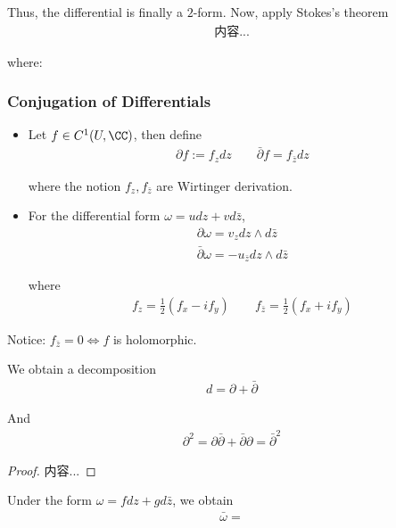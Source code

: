 \documentclass[Total.tex]{subfiles}
\begin{document}
		
		Thus, the differential is finally a $2$-form. Now, apply Stokes's theorem
		\begin{gather*}
			内容...
		\end{gather*}
		
		where: 
		
	\subsubsection{Conjugation of Differentials}
		\begin{Def}
			\begin{itemize}
				\item 
				Let $f\in C^1(U,\CC)$, then define
				\begin{gather*}
					\partial f:=f_zdz\qquad \bar{\partial} f=f_{\bar{z}}dz
				\end{gather*}
				
				where the notion $f_z,f_{\bar{z}}$ are Wirtinger derivation. 
				\item 
				For the differential form $\omega=udz+vd\bar{z}$,
				\begin{gather*}
					\partial\omega=v_z dz\wedge d\bar{z}\\
					\bar{\partial}\omega=-u_{\bar{z}} dz\wedge d\bar{z}
				\end{gather*}
				
				where 
				\begin{gather*}
					f_z=\frac{1}{2}(f_x-if_y)\qquad f_{\bar{z}}=\frac{1}{2}(f_x+if_y)
				\end{gather*}
			\end{itemize}
		\end{Def}
		
		
		Notice: $f_{\bar{z}}=0\Leftrightarrow f$ is holomorphic. 
		
		\begin{proposition}
			We obtain a decomposition
			\begin{gather*}
				d=\partial+\bar{\partial}
			\end{gather*}
			
			And 
			\begin{gather*}
				\partial^2=\partial\bar{\partial}+\bar{\partial}\partial=\bar{\partial}^2
			\end{gather*}
		\end{proposition}
		\begin{proof}
			内容...
		\end{proof}
	Under the form $\omega=fdz+gd\bar{z}$, we obtain
	\begin{gather*}
		\bar{\omega}=
	\end{gather*}
\end{document}
